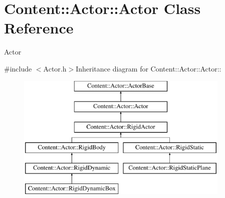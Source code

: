 \hypertarget{classContent_1_1Actor_1_1Actor}{
\section{Content::Actor::Actor Class Reference}
\label{classContent_1_1Actor_1_1Actor}
}


Actor  


{\ttfamily \#include $<$Actor.h$>$}Inheritance diagram for Content::Actor::Actor::\begin{figure}[H]
\begin{center}
\leavevmode
\includegraphics[height=6cm]{classContent_1_1Actor_1_1Actor}
\end{center}
\end{figure}
